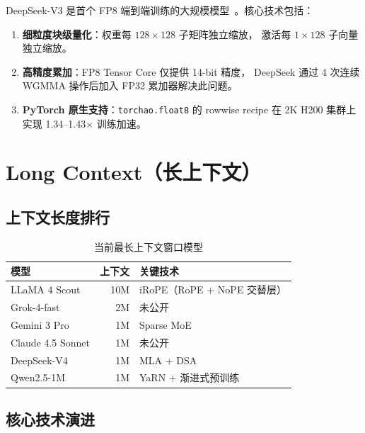 \documentclass[
  customlatinfont = macos,
]{hkustthesis}
\begin{document}
DeepSeek-V3 是首个 FP8 端到端训练的大规模模型~\cite{deepseekv3}。核心技术包括：

\begin{enumerate}[noitemsep]
  \item \textbf{细粒度块级量化}：权重每 $128 \times 128$ 子矩阵独立缩放，
        激活每 $1 \times 128$ 子向量独立缩放。
  \item \textbf{高精度累加}：FP8 Tensor Core 仅提供 14-bit 精度，
        DeepSeek 通过 4 次连续 WGMMA 操作后加入 FP32 累加器解决此问题。
  \item \textbf{PyTorch 原生支持}：\texttt{torchao.float8} 的 rowwise recipe
        在 2K H200 集群上实现 1.34--1.43$\times$ 训练加速。
\end{enumerate}


\chapter{Long Context（长上下文）}
\label{ch:long-context}

\section{上下文长度排行}

\begin{table}[H]
\centering\small
\caption{当前最长上下文窗口模型}
\label{tab:long-ctx}
\begin{tabularx}{\linewidth}{l r X}
\toprule
\textbf{模型} & \textbf{上下文} & \textbf{关键技术} \\
\midrule
LLaMA 4 Scout    & 10M  & iRoPE（RoPE + NoPE 交替层） \\
Grok-4-fast       & 2M   & 未公开 \\
Gemini 3 Pro      & 1M   & Sparse MoE \\
Claude 4.5 Sonnet & 1M   & 未公开 \\
DeepSeek-V4       & 1M   & MLA + DSA \\
Qwen2.5-1M        & 1M   & YaRN + 渐进式预训练 \\
\bottomrule
\end{tabularx}
\end{table}

\section{核心技术演进}
\end{document}
